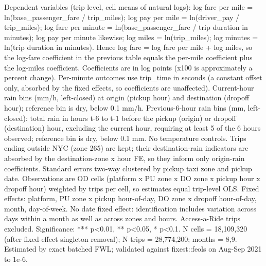 \par \raggedright 
Dependent variables (trip level, cell means of natural logs): log fare per mile = ln(base\_passenger\_fare / trip\_miles); log pay per mile = ln(driver\_pay / trip\_miles); log fare per minute = ln(base\_passenger\_fare / trip duration in minutes); log pay per minute likewise; log miles = ln(trip\_miles); log minutes = ln(trip duration in minutes). Hence log fare = log fare per mile + log miles, so the log-fare coefficient in the previous table equals the per-mile coefficient plus the log-miles coefficient. Coefficients are in log points (x100 is approximately a percent change). Per-minute outcomes use trip\_time in seconds (a constant offset only, absorbed by the fixed effects, so coefficients are unaffected). Current-hour rain bins (mm/h, left-closed) at origin (pickup hour) and destination (dropoff hour); reference bin is dry, below 0.1 mm/h. Previous-6-hour rain bins (mm, left-closed): total rain in hours t-6 to t-1 before the pickup (origin) or dropoff (destination) hour, excluding the current hour, requiring at least 5 of the 6 hours observed; reference bin is dry, below 0.1 mm. No temperature controls. Trips ending outside NYC (zone 265) are kept; their destination-rain indicators are absorbed by the destination-zone x hour FE, so they inform only origin-rain coefficients. Standard errors two-way clustered by pickup taxi zone and pickup date. Observations are OD cells (platform x PU zone x DO zone x pickup hour x dropoff hour) weighted by trips per cell, so estimates equal trip-level OLS. Fixed effects: platform, PU zone x pickup hour-of-day, DO zone x dropoff hour-of-day, month, day-of-week. No date fixed effect: identification includes variation across days within a month as well as across zones and hours. Access-a-Ride trips excluded. Significance: *** p<0.01, ** p<0.05, * p<0.1. N cells = 18,109,320 (after fixed-effect singleton removal); N trips = 28,774,200; months = 8,9. Estimated by exact batched FWL; validated against fixest::feols on Aug-Sep 2021 to 1e-6.
\par\endgroup
\ifdefined\ifclassloaded
{}
\fi

